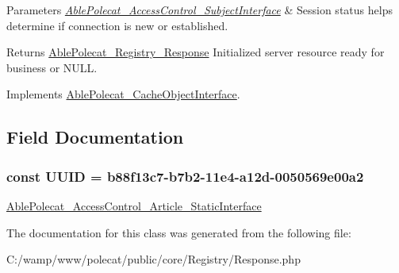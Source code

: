\begin{DoxyParams}{Parameters}
{\em \hyperlink{interface_able_polecat___access_control___subject_interface}{Able\+Polecat\+\_\+\+Access\+Control\+\_\+\+Subject\+Interface}} & Session status helps determine if connection is new or established.\\
\hline
\end{DoxyParams}
\begin{DoxyReturn}{Returns}
\hyperlink{class_able_polecat___registry___response}{Able\+Polecat\+\_\+\+Registry\+\_\+\+Response} Initialized server resource ready for business or N\+U\+L\+L. 
\end{DoxyReturn}


Implements \hyperlink{interface_able_polecat___cache_object_interface_a3f2135f6ad45f51d075657f6d20db2cd}{Able\+Polecat\+\_\+\+Cache\+Object\+Interface}.



\subsection{Field Documentation}
\hypertarget{class_able_polecat___registry___response_a74b892c8c0b86bf9d04c5819898c51e7}{}
\subsubsection[{U\+U\+I\+D}]{\setlength{\rightskip}{0pt plus 5cm}const U\+U\+I\+D = \textquotesingle{}b88f13c7-\/b7b2-\/11e4-\/a12d-\/0050569e00a2\textquotesingle{}}\label{class_able_polecat___registry___response_a74b892c8c0b86bf9d04c5819898c51e7}
\hyperlink{interface_able_polecat___access_control___article___static_interface}{Able\+Polecat\+\_\+\+Access\+Control\+\_\+\+Article\+\_\+\+Static\+Interface} 

The documentation for this class was generated from the following file\+:\begin{DoxyCompactItemize}
\item 
C\+:/wamp/www/polecat/public/core/\+Registry/Response.\+php\end{DoxyCompactItemize}

